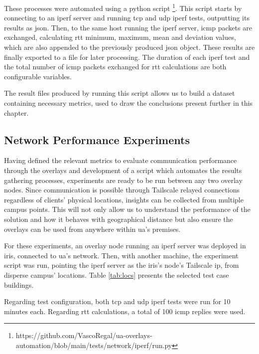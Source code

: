 \documentclass[11pt,twoside,a4paper]{report}
\begin{document}
These processes were automated using a python script \footnote{https://github.com/VascoRegal/ua-overlays-automation/blob/main/tests/network/iperf/run.py}. This script starts by connecting to an iperf server and running \ac{tcp} and \ac{udp} iperf tests, outputting its results as \ac{json}. Then, to the same host running the iperf server, \ac{icmp} packets are exchanged, calculating \ac{rtt} minimum, maximum, mean and deviation values, which are also appended to the previously produced \ac{json} object. These results are finally exported to a file for later processing. The duration of each iperf test and the total number of \ac{icmp} packets exchanged for \ac{rtt} calculations are both configurable variables.

The result files produced by running this script allows us to build a dataset containing necessary metrics, used to draw the conclusions present further in this chapter.

\subsection{Network Performance Experiments}
\label{ss:netperf}

Having defined the relevant metrics to evaluate communication performance through the overlays and development of a script which automates the results gathering processes, experiments are ready to be run between any two overlay nodes. Since communication is possible through Tailscale relayed connections regardless of clients' physical locations, insights can be collected from multiple campus points. This will not only allow us to understand the performance of the solution and how it behaves with geographical distance but also ensure the overlays can be used from anywhere within \ac{ua}'s premises.

For these experiments, an overlay node running an iperf server was deployed in \ac{iris}, connected to \ac{ua}'s network. Then, with another machine, the experiment script was run, pointing the iperf server as the \ac{iris}'s node's Tailscale \ac{ip}, from disperse campus' locations. Table \ref{tab:locs} presents the selected test case buildings.

Regarding test configuration, both \ac{tcp} and \ac{udp} iperf tests were run for 10 minutes each. Regarding \ac{rtt} calculations, a total of 100 \ac{icmp} replies were used.
\end{document}
